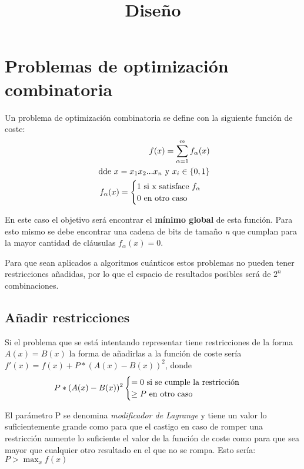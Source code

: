 \documentclass{article}
\title{Diseño}
\begin{document}
\maketitle{}

\section{Problemas de optimización combinatoria}
\label{sec:3-problemas de optimizacion combinatoria}

Un problema de optimización combinatoria se define con la siguiente función de coste:
\begin{align*}
  f(x) = \sum_{\alpha = 1}^{m} f_\alpha(x) \\
  \textnormal{ dde } x = x_1x_2...x_n \textnormal{ y } x_i\in{\{0, 1\}} \\
   f_{\alpha}(x) = \begin{cases}
     1 \textnormal{ si x satisface } f_\alpha \\
     0 \textnormal{ en otro caso}
   \end{cases}
\end{align*}

En este caso el objetivo será encontrar el \textbf{mínimo global} de esta función. Para esto mismo se debe encontrar una cadena de bits de tamaño \textit{n} que cumplan para la mayor cantidad de cláusulas $f_\alpha(x) = 0$.

Para que sean aplicados a algoritmos cuánticos estos problemas no pueden tener restricciones añadidas, por lo que el espacio de resultados posibles será de $2^n$ combinaciones.

\subsection{Añadir restricciones}

Si el problema que se está intentando representar tiene restricciones de la forma $A(x) = B(x)$ la forma de añadirlas a la función de coste sería $f'(x) = f(x) + P*(A(x)-B(x))^2$, donde
\begin{align*}
  P*(A(x) - B(x))^2 \begin{cases}
    = 0 \textnormal{ si se cumple la restricción } \\
    \ge P \textnormal{ en otro caso }
  \end{cases}
\end{align*}

El parámetro P se denomina \textit{modificador de Lagrange} y tiene un valor lo suficientemente grande como para que el castigo en caso de romper una restricción aumente lo suficiente el valor de la función de coste como para que sea mayor que cualquier otro resultado en el que no se rompa. Esto sería: $P > \max_xf(x)$
\end{document}
